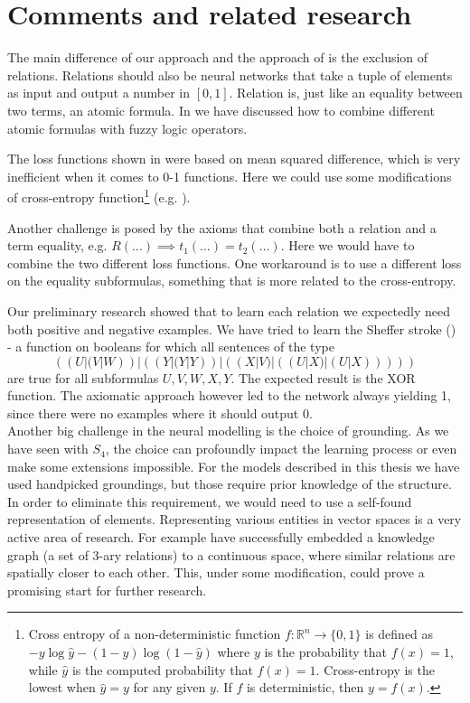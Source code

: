 \chapter{Comments and related research}
\label{comments}
The main difference of our approach and the approach of \cite{serafini} is the exclusion of relations. Relations should also be neural networks that take a tuple of elements as input and output a number in $[0,1]$. Relation is, just like an equality between two terms, an atomic formula. In  we have discussed how to combine different atomic formulas with fuzzy logic operators.

The loss functions shown in  were based on mean squared difference, which is very inefficient when it comes to 0-1 functions. Here we could use some modifications of cross-entropy function\footnote{Cross entropy of a non-deterministic function $f:\mathbb{R}^n\rightarrow \{0,1\}$ is defined as $-y\log\widehat{y}-(1-y)\log(1-\widehat{y})$ where $y$ is the probability that $f(x)=1$, while $\widehat{y}$ is the computed probability that $f(x)=1$. Cross-entropy is the lowest when $\widehat{y}=y$ for any given $y$. If $f$ is deterministic, then $y=f(x)$.} (e.g. \cite{crossentropy}).

Another challenge is posed by the axioms that combine both a relation and a term equality, e.g. $R(\dots)\implies t_1(\dots)=t_2(\dots)$. Here we would have to combine the two different loss functions. One workaround is to use a different loss on the equality subformulas, something that is more related to the cross-entropy.

Our preliminary research showed that to learn each relation we expectedly need both positive and negative examples. We have tried to learn the Sheffer stroke (\cite{sheffer}) - a function on booleans for which all sentences of the type $$((U|(V|W))|((Y|(Y|Y))|((X|V)|((U|X)|(U|X)))))$$ are true for all subformulas $U,V,W,X,Y$. The expected result is the XOR function. The axiomatic approach however led to the network always yielding 1, since there were no examples where it should output 0.\\

Another big challenge in the neural modelling is the choice of grounding. As we have seen with $S_4$, the choice can profoundly impact the learning process or even make some extensions impossible. For the models described in this thesis we have used handpicked groundings, but those require prior knowledge of the structure. In order to eliminate this requirement, we would need to use a self-found representation of elements. Representing various entities in vector spaces is a very active area of research. For example \cite{grounding_wang} have successfully embedded a knowledge graph (a set of 3-ary relations) to a continuous space, where similar relations are spatially closer to each other. This, under some modification, could prove a promising start for further research.\\

